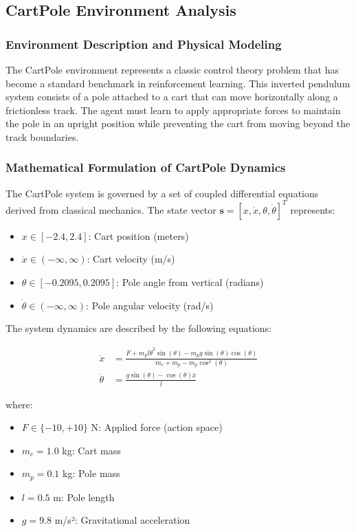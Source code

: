 \documentclass[12pt]{article}
\begin{document}
{{{\subsection{CartPole Environment Analysis}

\subsubsection{Environment Description and Physical Modeling}

The CartPole environment represents a classic control theory problem that has become a standard benchmark in reinforcement learning. This inverted pendulum system consists of a pole attached to a cart that can move horizontally along a frictionless track. The agent must learn to apply appropriate forces to maintain the pole in an upright position while preventing the cart from moving beyond the track boundaries.

\subsubsection{Mathematical Formulation of CartPole Dynamics}

The CartPole system is governed by a set of coupled differential equations derived from classical mechanics. The state vector $\mathbf{s} = [x, \dot{x}, \theta, \dot{\theta}]^T$ represents:

\begin{itemize}
    \item $x \in [-2.4, 2.4]$: Cart position (meters)
    \item $\dot{x} \in (-\infty, \infty)$: Cart velocity (m/s)
    \item $\theta \in [-0.2095, 0.2095]$: Pole angle from vertical (radians)
    \item $\dot{\theta} \in (-\infty, \infty)$: Pole angular velocity (rad/s)
\end{itemize}

The system dynamics are described by the following equations:

\begin{align}
\ddot{x} &= \frac{F + m_p l \dot{\theta}^2 \sin(\theta) - m_p g \sin(\theta)\cos(\theta)}{m_c + m_p - m_p \cos^2(\theta)} \\
\ddot{\theta} &= \frac{g \sin(\theta) - \cos(\theta) \ddot{x}}{l}
\end{align}

where:
\begin{itemize}
    \item $F \in \{-10, +10\}$ N: Applied force (action space)
    \item $m_c = 1.0$ kg: Cart mass
    \item $m_p = 0.1$ kg: Pole mass
    \item $l = 0.5$ m: Pole length
    \item $g = 9.8$ m/s²: Gravitational acceleration
\end{itemize}

}}}
\end{document}
